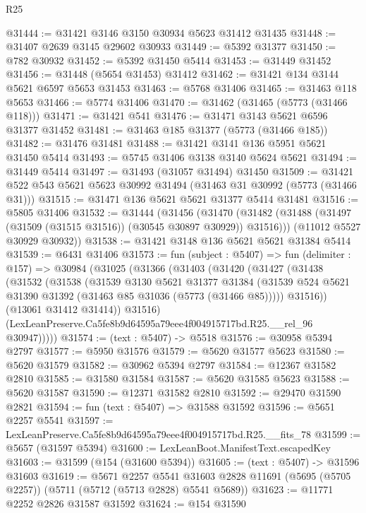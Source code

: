 \begin{lexlean}{R25}
\begin{coremodule}
@31444 := @31421 @3146 @3150 @30934 @5623 @31412 @31435
@31448 := @31407 @2639 @3145 @29602 @30933
@31449 := @5392 @31377
@31450 := @782 @30932
@31452 := @5392 @31450 @5414
@31453 := @31449 @31452
@31456 := @31448 (@5654 @31453) @31412
@31462 := @31421 @134 @3144 @5621 @6597 @5653 @31453
@31463 := @5768 @31406
@31465 := @31463 @118 @5653
@31466 := @5774 @31406
@31470 := @31462 (@31465 (@5773 (@31466 @118)))
@31471 := @31421 @541
@31476 := @31471 @3143 @5621 @6596 @31377 @31452
@31481 := @31463 @185 @31377 (@5773 (@31466 @185))
@31482 := @31476 @31481
@31488 := @31421 @3141 @136 @5951 @5621 @31450 @5414
@31493 := @5745 @31406 @3138 @3140 @5624 @5621
@31494 := @31449 @5414
@31497 := @31493 (@31057 @31494) @31450
@31509 := @31421 @522 @543 @5621 @5623 @30992 @31494 (@31463 @31 @30992 (@5773 (@31466 @31)))
@31515 := @31471 @136 @5621 @5621 @31377 @5414 @31481
@31516 := @5805 @31406
@31532 := @31444
    (@31456
      (@31470 (@31482 (@31488 (@31497 (@31509 (@31515 @31516)) (@30545 @30897 @30929)) @31516)))
      (@11012 @5527 @30929 @30932))
@31538 := @31421 @3148 @136 @5621 @5621 @31384 @5414
@31539 := @6431 @31406
@31573 := fun (subject : @5407) =>
  fun (delimiter : @157) =>
  @30984
    (@31025
      (@31366
        (@31403
          (@31420
            (@31427
              (@31438
                (@31532
                  (@31538
                    (@31539
                      @3130
                      @5621
                      @31377
                      @31384
                      (@31539 @524 @5621 @31390 @31392 (@31463 @85 @31036 (@5773 (@31466 @85)))))
                    @31516))
                (@13061 @31412 @31414))
              @31516)
            (LexLeanPreserve.Ca5fe8b9d64595a79eee4f004915717bd.R25.__rel_96 @30947)))))
@31574 := (text : @5407) -> @5518
@31576 := @30958 @5394 @2797
@31577 := @5950 @31576
@31579 := @5620 @31577 @5623
@31580 := @5620 @31579
@31582 := @30962 @5394 @2797
@31584 := @12367 @31582 @2810
@31585 := @31580 @31584
@31587 := @5620 @31585 @5623
@31588 := @5620 @31587
@31590 := @12371 @31582 @2810
@31592 := @29470 @31590 @2821
@31594 := fun (text : @5407) => @31588 @31592
@31596 := @5651 @2257 @5541
@31597 := LexLeanPreserve.Ca5fe8b9d64595a79eee4f004915717bd.R25.__fits_78
@31599 := @5657 (@31597 @5394)
@31600 := LexLeanBoot.ManifestText.escapedKey
@31603 := @31599 (@154 (@31600 @5394))
@31605 := (text : @5407) -> @31596 @31603
@31619 := @5671
    @2257
    @5541
    @31603
    @2828
    @11691
    (@5695 (@5705 @2257))
    (@5711 (@5712 (@5713 @2828) @5541 @5689))
@31623 := @11771 @2252 @2826 @31587 @31592
@31624 := @154 @31590

\end{coremodule}
\end{lexlean}
